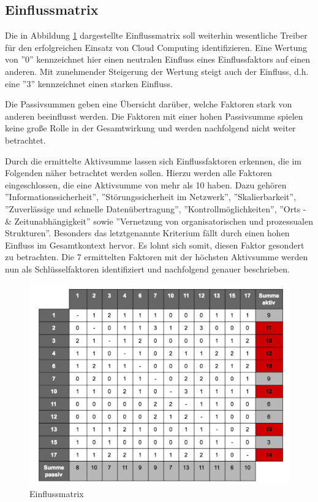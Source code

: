 \subsection{Einflussmatrix}

Die in Abbildung \ref{fig:matrix} dargestellte Einflussmatrix soll weiterhin wesentliche Treiber für den erfolgreichen Einsatz von Cloud Computing identifizieren. Eine Wertung von ''0'' kennzeichnet hier einen neutralen Einfluss eines Einflussfaktors auf einen anderen. Mit zunehmender Steigerung der Wertung steigt auch der Einfluss, d.h. eine ''3'' kennzeichnet einen starken Einfluss. 

Die Passivsummen geben eine Übersicht darüber, welche Faktoren stark von anderen beeinflusst werden. Die Faktoren mit einer hohen Passivsumme spielen keine große Rolle in der Gesamtwirkung und werden nachfolgend nicht weiter betrachtet.

Durch die ermittelte Aktivsumme lassen sich Einflussfaktoren erkennen, die im Folgenden näher betrachtet werden sollen. Hierzu werden alle Faktoren eingeschlossen, die eine Aktivsumme von mehr als 10 haben. Dazu gehören ''Informationssicherheit'', ''Störungssicherheit im Netzwerk'', ''Skalierbarkeit'', ''Zuverlässige und schnelle Datenübertragung'', ''Kontrollmöglichkeiten'', ''Orts - \& Zeitunabhängigkeit'' sowie ''Vernetzung von organisatorischen und prozessualen Strukturen''. Besonders das letztgenannte Kriterium fällt durch einen hohen Einfluss im Gesamtkontext hervor. Es lohnt sich somit, diesen Faktor gesondert zu betrachten. Die 7 ermittelten Faktoren mit der höchsten Aktivsumme werden nun als Schlüsselfaktoren identifiziert und nachfolgend genauer beschrieben.

\begin{figure}
	\centering
	\includegraphics[width=\linewidth]{images/matrix}
	\caption[Caption for parameters]{Einflussmatrix}
	\label{fig:matrix}
\end{figure}

